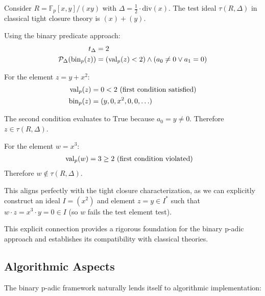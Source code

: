 \begin{example}\label{ex:tight-closure-test}
Consider $R = \mathbb{F}_p[x,y]/(xy)$ with $\Delta = \frac{1}{2} \cdot \text{div}(x)$. The test ideal $\tau(R,\Delta)$ in classical tight closure theory is $(x) + (y)$.

Using the binary predicate approach:
\begin{align*}
t_\Delta &= 2 \\
\mathcal{P}_\Delta(\operatorname{bin}_p(z)) &= (\operatorname{val}_p(z) < 2) \wedge (a_0 \neq 0 \vee a_1 = 0)
\end{align*}

For the element $z = y + x^2$:
\begin{align*}
\operatorname{val}_p(z) &= 0 < 2 \text{ (first condition satisfied)} \\
\operatorname{bin}_p(z) &= (y, 0, x^2, 0, 0, \ldots) \\
\end{align*}

The second condition evaluates to $\text{True}$ because $a_0 = y \neq 0$. Therefore $z \in \tau(R,\Delta)$.

For the element $w = x^3$:
\begin{align*}
\operatorname{val}_p(w) &= 3 \geq 2 \text{ (first condition violated)}
\end{align*}
Therefore $w \not\in \tau(R,\Delta)$.

This aligns perfectly with the tight closure characterization, as we can explicitly construct an ideal $I = (x^2)$ and element $z = y \in I^*$ such that $w \cdot z = x^3 \cdot y = 0 \in I$ (so $w$ fails the test element test).
\end{example}

This explicit connection provides a rigorous foundation for the binary p-adic approach and establishes its compatibility with classical theories.

\subsection{Algorithmic Aspects}

The binary p-adic framework naturally lends itself to algorithmic implementation:

